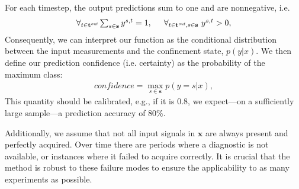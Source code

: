 For each timestep, the output predictions sum to one and are nonnegative, i.e.
\begin{align}
    \forall_{t \in \mathbf{t}^{\textit{out}}}\textstyle\sum_{s\in \mathbf{s}}y^{s,t} = 1, \hspace{.5cm} \forall_{t \in \mathbf{t}^{\textit{out}},s \in \mathbf{s}} \ y^{s,t} > 0,
\end{align}
Consequently, we can interpret our function as the conditional distribution between the input measurements and the confinement state, $p(y|x)$. We then define our prediction confidence (i.e. certainty) as the probability of the maximum class:
\begin{align}
    \textit{confidence} = \max_{s \in \mathbf{s}}p(y = s | x),
    \label{eq:confidence}
\end{align}
This quantity should be calibrated, e.g., if it is 0.8, we expect---on a sufficiently large sample---a prediction accuracy of 80\%.

Additionally, we assume that not all input signals in $\mathbf{x}$ are always present and perfectly acquired. Over time there are periods where a diagnostic is not available, or instances where it failed to acquire correctly. It is crucial that the method is robust to these failure modes to ensure the applicability to as many experiments as possible.  %



